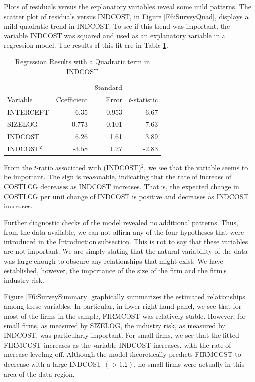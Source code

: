 Plots of residuals versus the explanatory variables reveal some mild
patterns. The scatter plot of residuals versus INDCOST, in Figure
\ref{F6:SurveyQuad}, displays a mild quadratic trend in INDCOST. To
see if this trend was important, the variable INDCOST was squared
and used as an explanatory variable in a regression model. The
results of this fit are in Table \ref{T6:FirmRiskQuad}.



\begin{table}[h]
 \caption{\label{T6:FirmRiskQuad} Regression Results
with a Quadratic term in INDCOST}
\begin{tabular}{l|rrr}
\hline
 &  & Standard &  \\
Variable & Coefficient & Error & $t$-statistic \\
\hline
INTERCEPT & 6.35 & 0.953 & 6.67 \\
SIZELOG & -0.773 & 0.101 & -7.63\\
INDCOST & 6.26 & 1.61 & 3.89\\
INDCOST$^2$ & -3.58 & 1.27 & -2.83 \\

\hline
\end{tabular}
  \end{table}

From the \textit{t-}ratio associated with (INDCOST)$^{2}$, we see
that the variable seems to be important. The sign is reasonable,
indicating that the rate of increase of COSTLOG decreases as INDCOST
increases. That is, the expected change in COSTLOG per unit change
of INDCOST is positive and decreases as INDCOST increases.

Further diagnostic checks of the model revealed no additional patterns.
Thus, from the data available, we can not affirm any of the four hypotheses
that were introduced in the Introduction subsection. This is not to say that
these variables are not important. We are simply stating that the natural
variability of the data was large enough to obscure any relationships that
might exist. We have established, however, the importance of the size of the
firm and the firm's industry risk.

Figure \ref{F6:SurveySummary} graphically summarizes the estimated
relationships among these variables. In particular, in lower right
hand panel, we see that for most of the firms in the sample,
FIRMCOST was relatively stable. However, for small firms, as
measured by SIZELOG, the industry risk, as measured by INDCOST, was
particularly important. For small firms, we see that the fitted
FIRMCOST increases as the variable INDCOST increases, with the rate
of increase leveling off. Although the model theoretically predicts
FIRMCOST to decrease with a large INDCOST $(>1.2)$, no small firms
were actually in this area of the data region.



